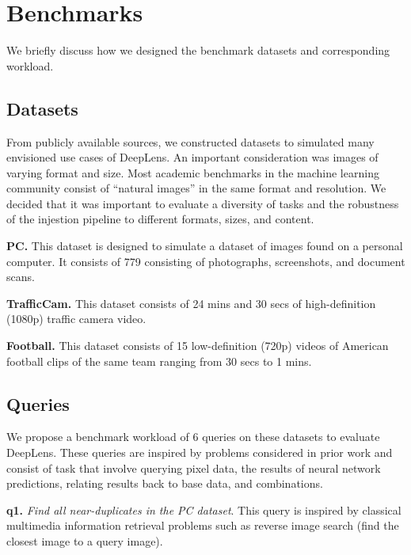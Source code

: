 \section{Benchmarks}
We briefly discuss how we designed the benchmark datasets and corresponding workload.

\subsection{Datasets}
From publicly available sources, we constructed datasets to simulated many envisioned use cases of \textsf{DeepLens}. An important consideration was images of varying format and size. Most academic benchmarks in the machine learning community consist of ``natural images'' in the same format and resolution. We decided that it was important to evaluate a diversity of tasks and the robustness of the injestion pipeline to different formats, sizes, and content. 

\vspace{0.25em} \noindent \textbf{PC.} This dataset is designed to simulate a dataset of images found on a personal computer. It consists of 779 consisting of photographs, screenshots, and document scans. 

\vspace{0.25em} \noindent \textbf{TrafficCam.} This dataset consists of 24 mins and 30 secs of high-definition (1080p) traffic camera video. 

\vspace{0.25em} \noindent \textbf{Football.} This dataset consists of 15 low-definition (720p) videos of American football clips of the same team ranging from 30 secs to 1 mins. 

\subsection{Queries}
We propose a benchmark workload of 6 queries on these datasets to evaluate \textsf{DeepLens}. These queries are inspired by problems considered in prior work and consist of task that involve querying pixel data, the results of neural network predictions, relating results back to base data, and combinations.

\vspace{0.25em} \noindent \textbf{q1.} \emph{Find all near-duplicates in the PC dataset}. This query is inspired by classical multimedia information retrieval problems such as reverse image search (find the closest image to a query image). 

